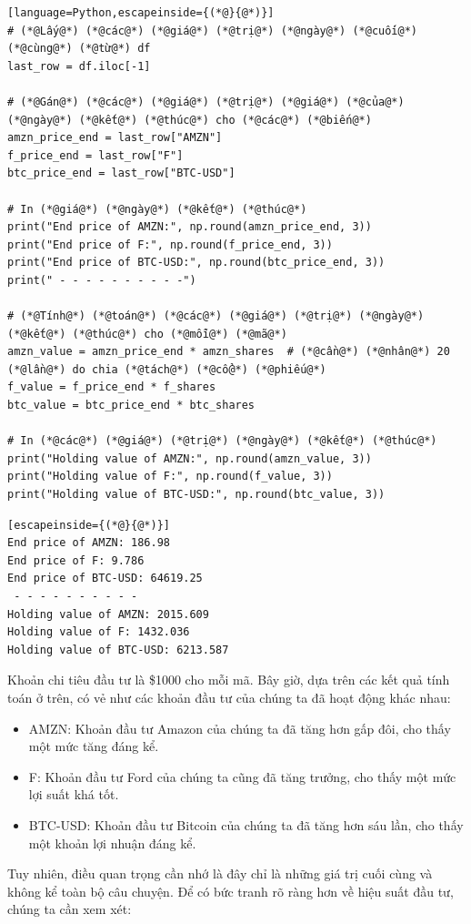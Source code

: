 \begin{lstlisting}[language=Python,escapeinside={(*@}{@*)}]
# (*@Lấy@*) (*@các@*) (*@giá@*) (*@trị@*) (*@ngày@*) (*@cuối@*) (*@cùng@*) (*@từ@*) df
last_row = df.iloc[-1]

# (*@Gán@*) (*@các@*) (*@giá@*) (*@trị@*) (*@giá@*) (*@của@*) (*@ngày@*) (*@kết@*) (*@thúc@*) cho (*@các@*) (*@biến@*)
amzn_price_end = last_row["AMZN"]
f_price_end = last_row["F"]
btc_price_end = last_row["BTC-USD"]

# In (*@giá@*) (*@ngày@*) (*@kết@*) (*@thúc@*)
print("End price of AMZN:", np.round(amzn_price_end, 3))
print("End price of F:", np.round(f_price_end, 3))
print("End price of BTC-USD:", np.round(btc_price_end, 3))
print(" - - - - - - - - - -")

# (*@Tính@*) (*@toán@*) (*@các@*) (*@giá@*) (*@trị@*) (*@ngày@*) (*@kết@*) (*@thúc@*) cho (*@mỗi@*) (*@mã@*)
amzn_value = amzn_price_end * amzn_shares  # (*@cần@*) (*@nhân@*) 20 (*@lần@*) do chia (*@tách@*) (*@cổ@*) (*@phiếu@*)
f_value = f_price_end * f_shares
btc_value = btc_price_end * btc_shares

# In (*@các@*) (*@giá@*) (*@trị@*) (*@ngày@*) (*@kết@*) (*@thúc@*)
print("Holding value of AMZN:", np.round(amzn_value, 3))
print("Holding value of F:", np.round(f_value, 3))
print("Holding value of BTC-USD:", np.round(btc_value, 3))
\end{lstlisting}

\begin{lstlisting}[escapeinside={(*@}{@*)}]
End price of AMZN: 186.98
End price of F: 9.786
End price of BTC-USD: 64619.25
 - - - - - - - - - -
Holding value of AMZN: 2015.609
Holding value of F: 1432.036
Holding value of BTC-USD: 6213.587
\end{lstlisting}

Khoản chi tiêu đầu tư là \$1000 cho mỗi mã. Bây giờ, dựa trên các kết quả tính toán ở trên, có vẻ như các khoản đầu tư của chúng ta đã hoạt động khác nhau:

\begin{itemize}
  \item AMZN: Khoản đầu tư Amazon của chúng ta đã tăng hơn gấp đôi, cho thấy một mức tăng đáng kể.
  \item F: Khoản đầu tư Ford của chúng ta cũng đã tăng trưởng, cho thấy một mức lợi suất khá tốt.
  \item BTC-USD: Khoản đầu tư Bitcoin của chúng ta đã tăng hơn sáu lần, cho thấy một khoản lợi nhuận đáng kể.
\end{itemize}
Tuy nhiên, điều quan trọng cần nhớ là đây chỉ là những giá trị cuối cùng và không kể toàn bộ câu chuyện. Để có bức tranh rõ ràng hơn về hiệu suất đầu tư, chúng ta cần xem xét:

